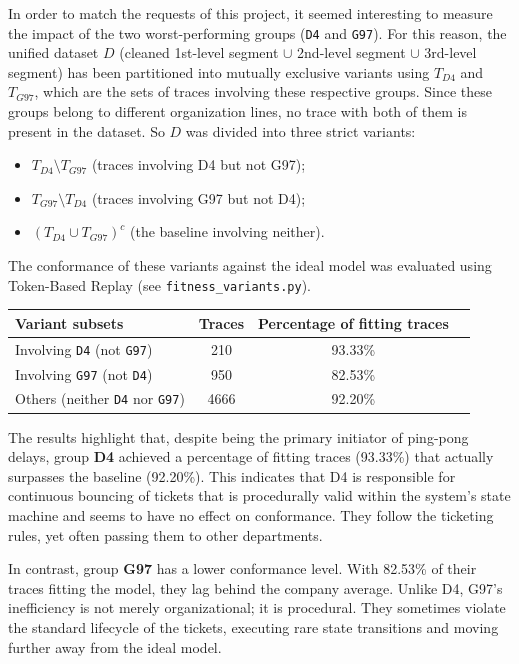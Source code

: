 \documentclass[11pt,a4paper]{article}
\begin{document}
In order to match the requests of this project, it seemed interesting to measure the impact of the two worst-performing groups (\texttt{D4} and \texttt{G97}). For this reason, the unified dataset $D$ (cleaned 1st-level segment $\cup$ 2nd-level segment $\cup$ 3rd-level segment) has been partitioned into mutually exclusive variants using $T_{D4}$ and $T_{G97}$, which are the sets of traces involving these respective groups. Since these groups belong to different organization lines, no trace with both of them is present in the dataset. So $D$ was divided into three strict variants: 
\begin{itemize}
    \item $T_{D4} \setminus T_{G97}$ (traces involving D4 but not G97);
    \item $T_{G97} \setminus T_{D4}$ (traces involving G97 but not D4);
    \item $(T_{D4} \cup T_{G97})^c$ (the baseline involving neither).
\end{itemize}

The conformance of these variants against the ideal model was evaluated using Token-Based Replay (see \texttt{fitness\_variants.py}).

\begin{table}[H]
    \centering
    \begin{tabular}{@{}lccc@{}}
        \toprule
        \textbf{Variant subsets} & \textbf{Traces} & \textbf{Percentage of fitting traces} \\ \midrule
        Involving \texttt{D4} (not \texttt{G97}) & 210 & 93.33\% \\
        Involving \texttt{G97} (not \texttt{D4}) & 950 & 82.53\% \\
        Others (neither \texttt{D4} nor \texttt{G97}) & 4666 & 92.20\% \\ \bottomrule
    \end{tabular}
\end{table}

The results highlight that, despite being the primary initiator of ping-pong delays, group \textbf{D4} achieved a percentage of fitting traces (93.33\%) that actually surpasses the baseline (92.20\%). This indicates that D4 is responsible for continuous bouncing of tickets that is procedurally valid within the system's state machine and seems to have no effect on conformance. They follow the ticketing rules, yet often passing them to other departments.

In contrast, group \textbf{G97} has a lower conformance level. With 82.53\% of their traces fitting the model, they lag behind the company average. Unlike D4, G97's inefficiency is not merely organizational; it is procedural. They sometimes violate the standard lifecycle of the tickets, executing rare state transitions and moving further away from the ideal model.
\end{document}
